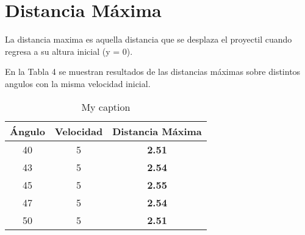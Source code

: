 \documentclass{article}
\begin{document}
\section{Distancia Máxima}

La distancia maxima es aquella distancia que se desplaza el proyectil cuando regresa a su altura inicial (y = 0).
 
En la Tabla 4 se muestran resultados de las distancias máximas sobre distintos angulos con la misma velocidad inicial.

\begin{table}[]
\centering
\caption{My caption}
\label{my-label}
\begin{tabular}{ccc}
\hline
Ángulo & Velocidad & \textbf{Distancia Máxima} \\ \hline
40     & 5         & \textbf{2.51}             \\ \hline
43     & 5         & \textbf{2.54}             \\ \hline
45     & 5         & \textbf{2.55}             \\ \hline
47     & 5         & \textbf{2.54}             \\ \hline
50     & 5         & \textbf{2.51}             \\ \hline
\end{tabular}
\end{table}




\end{document}
